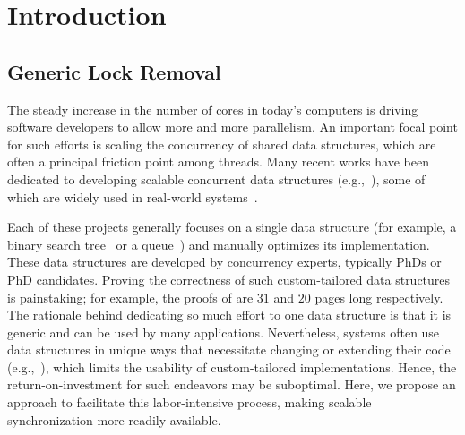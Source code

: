 
\section{Introduction} \label{sec:intro}

\subsection{Generic Lock Removal}
The steady increase in the number of cores in today's computers is driving software developers to allow more and more parallelism.
An important focal point for such efforts is scaling the concurrency of shared data structures, which are often a principal friction point among threads.
Many recent works have been dedicated to developing scalable concurrent data
structures (e.g.,~\cite{ArbelA2014,DrachslerVY2014,NatarajanM2014,BrownER2014,CrainGR2013,BraginskyP2012,
AfekKKMT2012,EllenFRB2010,BronsonCCO2010,HerlihyLLS2007,fraser2004practical,Michael:1996}),
some of which are widely used in real-world systems~\cite{Ohad:OOPSLA11}.

Each of these projects generally focuses on a single data
structure (for example, a binary search tree~\cite{BronsonCCO2010} or a queue~\cite{Michael:1996}) and manually optimizes its implementation. These data structures are developed by concurrency experts, typically PhDs or PhD candidates.
Proving the correctness of such custom-tailored data structures is painstaking;
for example, the proofs of \cite{BraginskyP2012,EllenFRB2010} are $31$ and $20$ pages long
respectively.
The rationale behind dedicating so much effort to one data structure is that it is
generic and can be used by many applications. Nevertheless,  systems often use data structures in unique ways
that necessitate changing or extending their code (e.g.,~\cite{levelDB,jmonkey,OhadThesis,zyulkyarov2009atomic}), which limits the usability of custom-tailored
implementations. Hence, the return-on-investment for such endeavors may be suboptimal.
Here, we propose an approach to facilitate this labor-intensive process,
making scalable synchronization more readily available.

